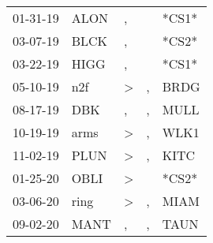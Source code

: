 \begin{supertabular}{p{0.07\textwidth}p{0.06\textwidth}p{0.02\textwidth}p{0.02\textwidth}p{0.06\textwidth}}
          01-31-19\textsuperscript{} &           ALON\textsuperscript{} &                , &                  &                            *CS1* \\
          03-07-19\textsuperscript{} &           BLCK\textsuperscript{} &                , &                  &                            *CS2* \\
          03-22-19\textsuperscript{} &           HIGG\textsuperscript{} &                , &                  &                            *CS1* \\
          05-10-19\textsuperscript{} &            n2f\textsuperscript{} &     \textgreater &                , &           BRDG\textsuperscript{} \\
          08-17-19\textsuperscript{} &            DBK\textsuperscript{} &                , &                , &           MULL\textsuperscript{} \\
          10-19-19\textsuperscript{} &           arms\textsuperscript{} &     \textgreater &                , &           WLK1\textsuperscript{} \\
          11-02-19\textsuperscript{} &           PLUN\textsuperscript{} &     \textgreater &                , &           KITC\textsuperscript{} \\
          01-25-20\textsuperscript{} &           OBLI\textsuperscript{} &     \textgreater &                  &                            *CS2* \\
          03-06-20\textsuperscript{} &           ring\textsuperscript{} &     \textgreater &                , &           MIAM\textsuperscript{} \\
          09-02-20\textsuperscript{} &           MANT\textsuperscript{} &                , &                , &           TAUN\textsuperscript{} \\
\end{supertabular}
